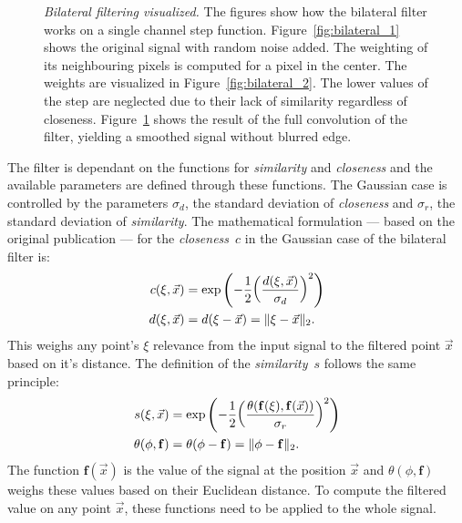 \begin{figure}[H]
\begin{subfigure}[b]{0.3\linewidth}
        \caption{}\label{fig:bilateral_3}
    \end{subfigure}
    \caption[Bilateral filtering visualized]{\emph{Bilateral filtering visualized.} The figures show how the bilateral filter works on a single channel step function. Figure~\ref{fig:bilateral_1} shows the original signal with random noise added. The weighting of its neighbouring pixels is computed for a pixel in the center. The weights are visualized in Figure~\ref{fig:bilateral_2}. The lower values of the step are neglected due to their lack of similarity regardless of closeness. Figure~\ref{fig:bilateral_3} shows the result of the full convolution of the filter, yielding a smoothed signal without blurred edge.}\label{fig:bilateral_filter}
\end{figure}
The filter is dependant on the functions for \emph{similarity} and \emph{closeness} and the available parameters are defined through these functions.
The Gaussian case is controlled by the parameters $\sigma_d$, the standard deviation of \emph{closeness} and $\sigma_r$, the standard deviation of \emph{similarity}.
The mathematical formulation --- based on the original publication\cite{tomasi_iccv98} --- for the \emph{closeness}~$c$ in the Gaussian case of the bilateral filter is:
\begin{equation}
\begin{aligned}
    c(\xi, \vec{x})&= \exp\left(-\frac{1}{2}{\left(\frac{d(\xi, \vec{x})}{\sigma_d} \right)}^2 \right) \\
    d(\xi, \vec{x})&= d(\xi - \vec{x}) = \lVert\xi - \vec{x}\rVert_{2} \text{.}
\end{aligned}
\end{equation}
This weighs any point's $\xi$ relevance from the input signal to the filtered point $\vec{x}$ based on it's distance.
The definition of the \emph{similarity}~$s$ follows the same principle:
\begin{equation}
\begin{aligned}
    s(\xi, \vec{x})&= \exp\left(-\frac{1}{2}{\left(\frac{\theta(\mathbf{f}(\xi), \mathbf{f}(\vec{x}))}{\sigma_r}\right)}^2\right) \\
    \theta(\phi, \mathbf{f})&= \theta(\phi - \mathbf{f}) = \lVert\phi - \mathbf{f}\rVert_{2}\text{.}
\end{aligned}
\end{equation}
The function $\mathbf{f}(\vec{x})$ is the value of the signal at the position $\vec{x}$ and $\theta(\phi, \mathbf{f})$ weighs these values based on their Euclidean distance.
To compute the filtered value on any point $\vec{x}$, these functions need to be applied to the whole signal.
